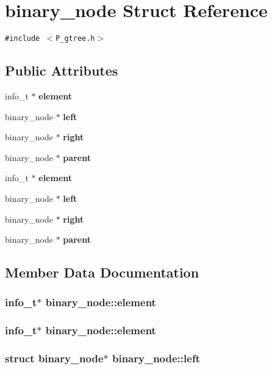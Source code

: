 \section{binary\_\-node  Struct Reference}
\label{structbinary__node}
{\tt \#include $<$P\_\-gtree.h$>$}

\subsection*{Public Attributes}
\begin{CompactItemize}
\item 
info\_\-t $\ast$ {\bf element}
\item 
binary\_\-node $\ast$ {\bf left}
\item 
binary\_\-node $\ast$ {\bf right}
\item 
binary\_\-node $\ast$ {\bf parent}
\item 
info\_\-t $\ast$ {\bf element}
\item 
binary\_\-node $\ast$ {\bf left}
\item 
binary\_\-node $\ast$ {\bf right}
\item 
binary\_\-node $\ast$ {\bf parent}
\end{CompactItemize}


\subsection{Member Data Documentation}
\subsubsection{\setlength{\rightskip}{0pt plus 5cm}info\_\-t$\ast$ binary\_\-node::element}\label{structbinary__node_m4}


\subsubsection{\setlength{\rightskip}{0pt plus 5cm}info\_\-t$\ast$ binary\_\-node::element}\label{structbinary__node_m0}


\subsubsection{\setlength{\rightskip}{0pt plus 5cm}struct binary\_\-node$\ast$ binary\_\-node::left}\label{structbinary__node_m5}


